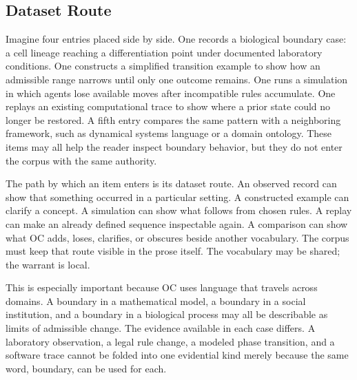 \documentclass[11pt,a4paper,openany]{book}
\begin{document}
\subsection{Dataset Route}
Imagine four entries placed side by side. One records a biological boundary case: a cell lineage reaching a differentiation point under documented laboratory conditions. One constructs a simplified transition example to show how an admissible range narrows until only one outcome remains. One runs a simulation in which agents lose available moves after incompatible rules accumulate. One replays an existing computational trace to show where a prior state could no longer be restored. A fifth entry compares the same pattern with a neighboring framework, such as dynamical systems language or a domain ontology. These items may all help the reader inspect boundary behavior, but they do not enter the corpus with the same authority. \cite{stauffer_percolation,grimmett_percolation}\par
The path by which an item enters is its dataset route. An observed record can show that something occurred in a particular setting. A constructed example can clarify a concept. A simulation can show what follows from chosen rules. A replay can make an already defined sequence inspectable again. A comparison can show what OC adds, loses, clarifies, or obscures beside another vocabulary. The corpus must keep that route visible in the prose itself. The vocabulary may be shared; the warrant is local.\par
This is especially important because OC uses language that travels across domains. A boundary in a mathematical model, a boundary in a social institution, and a boundary in a biological process may all be describable as limits of admissible change. The evidence available in each case differs. A laboratory observation, a legal rule change, a modeled phase transition, and a software trace cannot be folded into one evidential kind merely because the same word, boundary, can be used for each.\par
\end{document}
